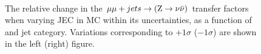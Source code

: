 \begin{figure}[]
  \centering
   ~~
  \\

  \caption{\label{fig:tfSyst_jec_mumuToZinv} The relative change in
  the $\mmj \rightarrow (\znunu)$ transfer
  factors when varying JEC in MC within its uncertainties, as a function of \scalht and jet category. 
  Variations corresponding to $+1\sigma$ ($-1\sigma$) are shown in the left (right) figure. 
  }
\end{figure}

